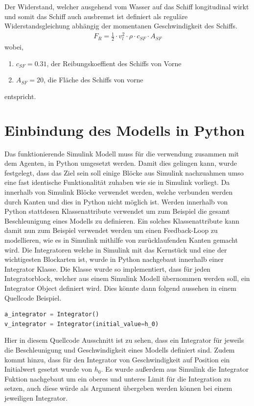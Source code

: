 \documentclass[]{iat}
\begin{document}
Der Widerstand, welcher ausgehend vom Wasser auf das Schiff longitudinal wirkt und somit das Schiff auch ausbremst ist definiert als reguläre Widerstandsgleichung abhängig der momentanen Geschwindigkeit des Schiffs.
\begin{align}
    F_R = \frac{1}{2} \cdot v_l^2 \cdot \rho \cdot c_{SF} \cdot A_{SF} \label{eq:front_resistance}
\end{align}
wobei,
\begin{enumerate}
    \item[] $c_{SF} = 0.31$, der Reibungskoeffient des Schiffs von Vorne
    \item[] $A_{SF} = 20$, die Fläche des Schiffs von vorne
\end{enumerate}
entspricht.


\section{Einbindung des Modells in Python}
Das funktionierende Simulink Modell muss für die verwendung zusammen mit dem Agenten, in Python umgesetzt werden. Damit dies gelingen kann, wurde festgelegt, dass das Ziel sein soll einige Blöcke aus Simulink nachzuahmen umso eine fast identische Funktionalität zuhaben wie sie in Simulink vorliegt. Da innerhalb von Simulink Blöcke verwendet werden, welche verbunden werden durch Kanten und dies in Python nicht möglich ist. Werden innerhalb von Python stattdesen Klassenattribute verwendet um zum Beispiel die gesamt Beschleunigung eines Modells zu definieren. Ein solches Klassenattribute kann damit nun zum Beispiel verwendet werden um einen Feedback-Loop zu modellieren, wie es in Simulink mithilfe von zurücklaufenden Kanten gemacht wird. Die Integratoren welche in Simulink mit das Kernstück und eine der wichtigesten Blockarten ist, wurde in Python nachgebaut innerhalb einer Integrator Klasse. Die Klasse wurde so implementiert, dass für jeden Integratorblock, welcher aus einem Simulink Modell übernommen werden soll, ein Integrator Object definiert wird. Dies könnte dann folgend aussehen in einem Quellcode Beispiel.
\begin{lstlisting}[language=Python]
a_integrator = Integrator()
v_integrator = Integrator(initial_value=h_0)
\end{lstlisting}
Hier in diesem Quellcode Ausschnitt ist zu sehen, dass ein Integrator für jeweils die Beschleunigung und Geschwindigkeit eines Modells definiert sind. Zudem kommt hinzu, dass für den Integrator von Geschwindigkeit auf Position ein Initialwert gesetzt wurde von $h_0$. Es wurde außerdem aus Simulink die Integrator Fuktion nachgebaut um ein oberes und unteres Limit für die Integration zu setzen, auch diese würde als Argument übergeben werden können bei einem jeweiligen Integrator.\\
\end{document}
